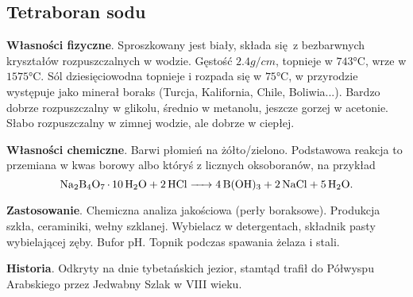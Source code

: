 \subsection{Tetraboran sodu }
\textbf{Własności fizyczne}.
Sproszkowany jest biały, składa się z bezbarwnych kryształów rozpuszczalnych w wodzie.
Gęstość $2.4 \si{g \per cm}$, topnieje w $743\si{\celsius}$, wrze w $1575\si{\celsius}$.
Sól dziesięciowodna topnieje i rozpada się w $75\si{\celsius}$, w przyrodzie występuje jako minerał boraks (Turcja, Kalifornia, Chile, Boliwia...).
Bardzo dobrze rozpuszczalny w glikolu, średnio w metanolu, jeszcze gorzej w acetonie.
Słabo rozpuszczalny w zimnej wodzie, ale dobrze w ciepłej.

\textbf{Własności chemiczne}.
Barwi płomień na żółto/zielono.
Podstawowa reakcja to przemiana w kwas borowy albo któryś z licznych oksoboranów, na przykład
$$\ce{Na2B4O7 * 10H2O + 2 HCl -> 4 B(OH)3 + 2 NaCl + 5 H2O}.$$

\textbf{Zastosowanie}.
Chemiczna analiza jakościowa (perły boraksowe).
Produkcja szkła, ceraminiki, wełny szklanej.
Wybielacz w detergentach, składnik pasty wybielającej zęby.
Bufor pH.
Topnik podczas spawania żelaza i stali.

\textbf{Historia}.
Odkryty na dnie tybetańskich jezior, stamtąd trafił do Półwyspu Arabskiego przez Jedwabny Szlak w VIII wieku.

